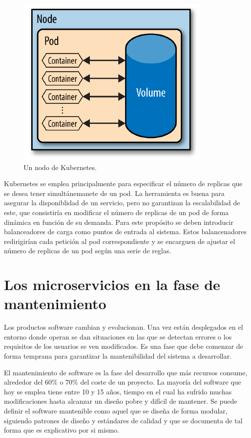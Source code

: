 \documentclass[11pt,spanish,listoffigures,listoftables]{tfgetsinf}
\begin{document}
\begin{figure}[h]
\centering
\includegraphics[scale=0.7]{kubernetes}
\caption{Un nodo de Kubernetes. \cite{Rensin2015}}
\end{figure}

Kubernetes se emplea principalmente para especificar el número de replicas que se desea tener simultánemanete de un pod. La herramienta es buena para asegurar la disponiblidad de un servicio, pero no garantizan la escalabilidad de este, que consistiría en modificar el número de replicas de un pod de forma dinámica en función de su demanda. Para este propósito se deben introducir balanceadores de carga como puntos de entrada al sistema. Estos balancenadores redirigirían cada petición al pod correspondiente y se encarguen de ajustar el número de replicas de un pod según una serie de reglas.

\section{Los microservicios en la fase de mantenimiento}

Los productos software cambian y evolucionan. Una vez están desplegados en el entorno donde operan se dan situaciones en las que se detectan errores o los requisitos de los usuarios se ven modificados. Es una fase que debe comenzar de forma temprana para garantizar la mantenibilidad del sistema a desarrollar. \cite{Bourque2014}

El mantenimiento de software es la fase del desarrollo que más recursos consume, alrededor del 60\% o 70\% del coste de un proyecto. La mayoría del software que hoy se emplea tiene entre 10 y 15 años, tiempo en el cual ha sufrido muchas modificaciones hasta alcanzar un diseño pobre y difícil de mantener. Se puede definir el software mantenible como aquel que se diseña de forma modular, siguiendo patrones de diseño y estándares de calidad y que se documenta de tal forma que es explicativo por si mismo. \cite{Pressman} 
\end{document}

